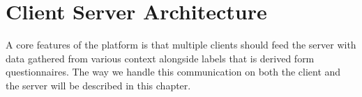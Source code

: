 
\chapter{Client Server Architecture}

A core features of the platform is that multiple clients should feed the server with data gathered from various context alongside labels that is derived form questionnaires. The way we handle this communication on both the client and the server will be described in this chapter.







